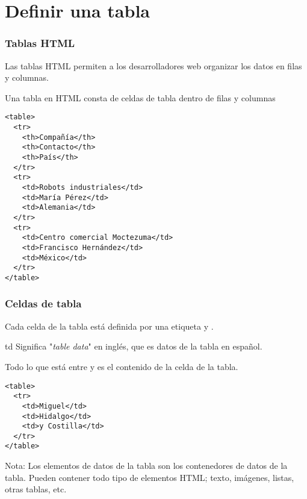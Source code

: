 
\section{Definir una tabla}

\begin{frame}[fragile]
  \frametitle{Tablas HTML}

  Las tablas HTML permiten a los desarrolladores web organizar
  los datos en filas y columnas.

  Una tabla en HTML consta de celdas de tabla dentro de filas y columnas

  \begin{lstlisting}
<table>
  <tr>
    <th>Compañía</th>
    <th>Contacto</th>
    <th>País</th>
  </tr>
  <tr>
    <td>Robots industriales</td>
    <td>María Pérez</td>
    <td>Alemania</td>
  </tr>
  <tr>
    <td>Centro comercial Moctezuma</td>
    <td>Francisco Hernández</td>
    <td>México</td>
  </tr>
</table> 
  \end{lstlisting}
\end{frame}

\begin{frame}[fragile]
  \frametitle{Celdas de tabla}

  Cada celda de la tabla está definida por una etiqueta 
  y .

  \begin{exampleblock}{td}
    Significa "\emph{table data}" en inglés, que es datos de la tabla
    en español.
  \end{exampleblock}

  Todo lo que está entre  y  es el contenido
  de la celda de la tabla.

  \begin{lstlisting}
<table>
  <tr>
    <td>Miguel</td>
    <td>Hidalgo</td>
    <td>y Costilla</td>
  </tr>
</table> 
  \end{lstlisting}

  \begin{block}{Nota:}
    Los elementos de datos de la tabla son los contenedores de datos
    de la tabla. Pueden contener todo tipo de elementos HTML; texto,
    imágenes, listas, otras tablas, etc.
  \end{block}
\end{frame}

